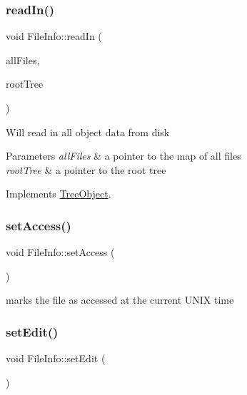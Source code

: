 \subsubsection{\texorpdfstring{read\+In()}{readIn()}}
{\footnotesize\ttfamily void File\+Info\+::read\+In (\begin{DoxyParamCaption}\item[{unordered\+\_\+multimap$<$ string, \mbox{\hyperlink{classFileInfo}{File\+Info}} $\ast$$>$ $\ast$}]{all\+Files,  }\item[{\mbox{\hyperlink{classRootTree}{Root\+Tree}} $\ast$}]{root\+Tree }\end{DoxyParamCaption})\hspace{0.3cm}{\ttfamily [virtual]}}

Will read in all object data from disk 
\begin{DoxyParams}{Parameters}
{\em all\+Files} & a pointer to the map of all files \\
\hline
{\em root\+Tree} & a pointer to the root tree \\
\hline
\end{DoxyParams}


Implements \mbox{\hyperlink{classTreeObject_a8247e79f2b4c1760649ac6f1af1c583f}{Tree\+Object}}.

\mbox{\label{classFileInfo_aba223845c8a1e7091626e6d241e5f069}} 
\subsubsection{\texorpdfstring{set\+Access()}{setAccess()}}
{\footnotesize\ttfamily void File\+Info\+::set\+Access (\begin{DoxyParamCaption}{ }\end{DoxyParamCaption})}

marks the file as accessed at the current U\+N\+IX time \mbox{\label{classFileInfo_a911b6fe0c76dbeb57613f447106b4d6a}} 
\subsubsection{\texorpdfstring{set\+Edit()}{setEdit()}}
{\footnotesize\ttfamily void File\+Info\+::set\+Edit (\begin{DoxyParamCaption}{ }\end{DoxyParamCaption})}


